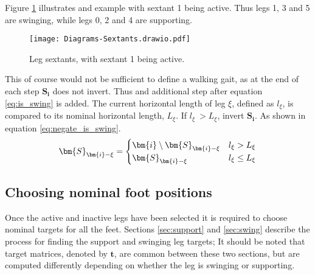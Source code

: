             Figure \ref{fig:sextants} illustrates and example with sextant 1 being active. Thus legs 1, 3 and 5 are swinging, while legs 0, 2 and 4 are supporting.
            \begin{figure}[h]
                \centering
                \hspace{1.1cm}
                \texttt{[image: Diagrams-Sextants.drawio.pdf]}
                \caption{Leg sextants, with sextant 1 being active.} 
                \label{fig:sextants}
            \end{figure}
            
            \noindent
            This of course would not be sufficient to define a walking gait, as at the end of each step \(\bm{S_i}\) does not invert.
            Thus and additional step after equation \ref{eq:is_swing} is added. The current horizontal length of leg \(\xi\), defined as \(l_\xi\), is compared to its nominal
            horizontal length, \(L_\xi\). If \(l_\xi\ > L_\xi\), invert \(\bm{S_i}\). As shown in equation \ref{eq:negate_is_swing}.
            \begin{equation} \label{eq:negate_is_swing}
                \bm{S}_{\bm{i} - \xi} =
                                                    \begin{cases}
                                                        \bm{i} \setminus \bm{S}_{\bm{i} - \xi} & l_\xi > L_\xi \\
                                                        \bm{S}_{\bm{i} - \xi} & l_\xi \leq L_\xi
                                                    \end{cases}\\[0.1cm]
            \end{equation}

            \newpage
        \subsection{Choosing nominal foot positions}\label{sec:choosing_nominal} 
            Once the active and inactive legs have been selected it is required to choose nominal targets for all the feet. Sections \ref{sec:support} and \ref{sec:swing}
            describe the process for finding the support and swinging leg targets; It should be noted that target matrices, denoted by \(\bm{t}\), are common between these two sections, but are computed
            differently depending on whether the leg is swinging or supporting.
                
